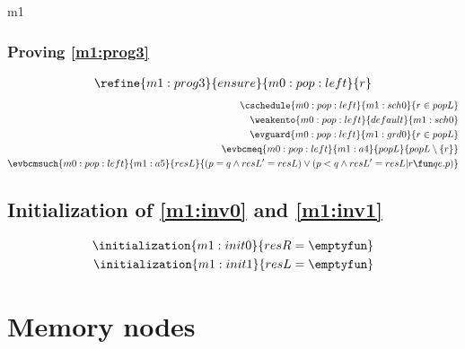 \documentclass[12pt]{amsart}
\begin{document}
\begin{machine}{m1}
\subsubsection{Proving \ref{m1:prog3}}
\begin{align*}
\refine{m1:prog3}{ensure}{m0:pop:left}{ \index{r}{r} }
\end{align*}
\begin{align*}
\cschedule{m0:pop:left}{m1:sch0}{ r \in popL }
\\ \weakento{m0:pop:left}{default}{m1:sch0}
\\ \evguard{m0:pop:left}{m1:grd0}{ r \in popL }
\\ \evbcmeq{m0:pop:left}{m1:a4}
	{popL}{ popL \setminus \{ r \} }
\\ \evbcmsuch{m0:pop:left}{m1:a5}{resL}
	{ 	 (p = q \land resL' = resL) 
	\lor (p < q \land resL' = resL | r \fun qe.p) }
\end{align*}

\subsection{Initialization of \ref{m1:inv0} and \ref{m1:inv1}}

\begin{align*}
\initialization{m1:init0}{resR = \emptyfun}
\\ \initialization{m1:init1}{resL = \emptyfun}
\end{align*}

\end{machine}
 




\section{Memory nodes}
\end{document}
